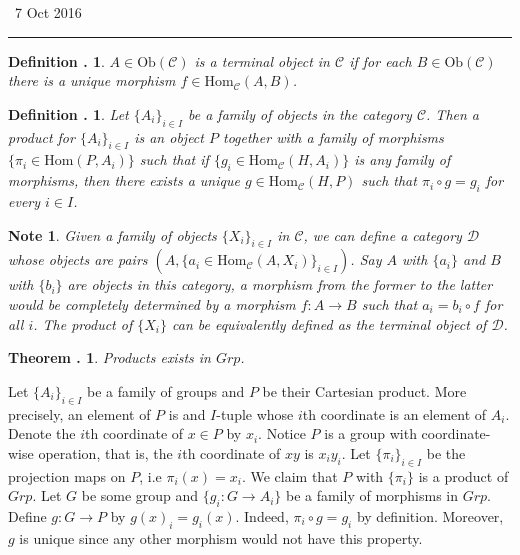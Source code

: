 \documentclass[twoside]{report}
\newcommand{\Ob}{\textrm{Ob}}
\newcommand{\Hom}{\textrm{Hom}}
\newcommand{\fanC}{\mathscr{C}}
\newcommand{\fanD}{\mathscr{D}}
\newcounter{Lecture}
\newcommand{\newLec}[1]{
  \stepcounter{Lecture}
  \noindent{\Large\bf Lecture \arabic{Lecture}} \, #1 \hfill  \rule[1ex]{2.5in}{.1pt} \vspace{1em}
}
\theoremstyle{myts}
\newcounter{c}[Lecture]
\newtheorem{dfn}[c]{Definition \arabic{Lecture}.}
\newtheorem{thm}[c]{Theorem \arabic{Lecture}.}
\newtheorem*{nte}{Note}
\newcounter{ex}
\newenvironment{prf}{
  \noindent\begin{mdframed}[style=prf]}{\end{mdframed} \vspace{1em}
}
\begin{document}
\newLec{7 Oct 2016}

\begin{dfn}
  \( A\in \Ob(\fanC) \) is a \emph{terminal object} in $\fanC$ if for each \( B\in\Ob(\fanC) \) there is a unique morphism \( f\in\Hom_\fanC(A,B) \).
\end{dfn}

\begin{dfn}
  Let \( \{ A_i \}_{ i\in I} \) be a family of objects in the category $\fanC$. Then a product for \( \{ A_i \}_{ i\in I} \) is an object $P$ together with a family of morphisms \( \{ \pi_i \in \Hom (P, A_i) \} \) such that if \( \{ g_i \in \Hom_\fanC(H,A_i) \} \) is any family of morphisms, then there exists a unique \( g\in \Hom_\fanC (H,P) \) such that \( \pi_i \circ g = g_i \) for every \(i\in I\).
\end{dfn}

\begin{nte}
  Given a family of objects \( \{ X_i \}_{i\in I} \) in $\fanC$, we can define a category $\fanD$ whose objects are pairs \( \left( A, \{ a_i \in\Hom_\fanC(A,X_i) \}_{i\in I} \right) \). Say $A$ with \( \{ a_i \} \) and $B$ with \( \{ b_i \} \) are objects in this category, a morphism from the former to the latter would be completely determined by a morphism \(f:A\to B\) such that \( a_i = b_i \circ f \) for all $i$. The product of \(\{ X_i \} \) can be equivalently defined as the terminal object of $\fanD$.
\end{nte}

\begin{thm}
  Products exists in $Grp$.
\end{thm}

\begin{prf}
  Let \( \{ A_i \}_{i\in I} \) be a family of groups and $P$ be their Cartesian product. More precisely, an element of $P$ is and $I$-tuple whose $i$th coordinate is an element of $A_i$. Denote the $i$th coordinate of \( x\in P \) by \(x_i\). Notice $P$ is a group with coordinate-wise operation, that is, the $i$th coordinate of $xy$ is $x_iy_i$. Let \( \{\pi_i\}_{i\in I} \) be the projection maps on $P$, i.e \( \pi_i(x) = x_i \). We claim that $P$ with \(\{\pi_i\}\) is a product of $Grp$. Let $G$ be some group and \(\{g_i:G\to A_i\}\) be a family of morphisms in $Grp$. Define \(g : G\to P\)  by \( g(x)_i = g_i(x) \). Indeed, \( \pi_i \circ g = g_i \) by definition. Moreover, $g$ is unique since any other morphism would not have this property.
\end{prf}
\end{document}
